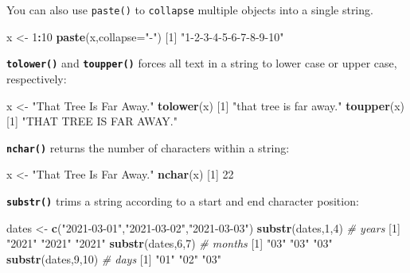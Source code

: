 \documentclass[
]{book}
\newenvironment{Shaded}{\begin{snugshade}}{\end{snugshade}}
\newcommand{\CommentTok}[1]{\textcolor[rgb]{0.56,0.35,0.01}{\textit{#1}}}
\newcommand{\DataTypeTok}[1]{\textcolor[rgb]{0.13,0.29,0.53}{#1}}
\newcommand{\DecValTok}[1]{\textcolor[rgb]{0.00,0.00,0.81}{#1}}
\newcommand{\KeywordTok}[1]{\textcolor[rgb]{0.13,0.29,0.53}{\textbf{#1}}}
\newcommand{\NormalTok}[1]{#1}
\newcommand{\OperatorTok}[1]{\textcolor[rgb]{0.81,0.36,0.00}{\textbf{#1}}}
\newcommand{\StringTok}[1]{\textcolor[rgb]{0.31,0.60,0.02}{#1}}
\begin{document}
You can also use \texttt{paste()} to \texttt{collapse} multiple objects into a single string.

\begin{Shaded}
\begin{Highlighting}[]
\NormalTok{x <-}\StringTok{ }\DecValTok{1}\OperatorTok{:}\DecValTok{10}
\KeywordTok{paste}\NormalTok{(x,}\DataTypeTok{collapse=}\StringTok{"-"}\NormalTok{)}
\NormalTok{[}\DecValTok{1}\NormalTok{] }\StringTok{"1-2-3-4-5-6-7-8-9-10"}
\end{Highlighting}
\end{Shaded}

\textbf{\texttt{tolower()}} and \textbf{\texttt{toupper()}} forces all text in a string to lower case or upper case, respectively:

\begin{Shaded}
\begin{Highlighting}[]
\NormalTok{x <-}\StringTok{ "That Tree Is Far Away."}
\KeywordTok{tolower}\NormalTok{(x)}
\NormalTok{[}\DecValTok{1}\NormalTok{] }\StringTok{"that tree is far away."}
\KeywordTok{toupper}\NormalTok{(x)}
\NormalTok{[}\DecValTok{1}\NormalTok{] }\StringTok{"THAT TREE IS FAR AWAY."}
\end{Highlighting}
\end{Shaded}

\textbf{\texttt{nchar()}} returns the number of characters within a string:

\begin{Shaded}
\begin{Highlighting}[]
\NormalTok{x <-}\StringTok{ "That Tree Is Far Away."}
\KeywordTok{nchar}\NormalTok{(x)}
\NormalTok{[}\DecValTok{1}\NormalTok{] }\DecValTok{22}
\end{Highlighting}
\end{Shaded}

\textbf{\texttt{substr()}} trims a string according to a start and end character position:

\begin{Shaded}
\begin{Highlighting}[]
\NormalTok{dates <-}\StringTok{ }\KeywordTok{c}\NormalTok{(}\StringTok{"2021-03-01"}\NormalTok{,}\StringTok{"2021-03-02"}\NormalTok{,}\StringTok{"2021-03-03"}\NormalTok{)}
\KeywordTok{substr}\NormalTok{(dates,}\DecValTok{1}\NormalTok{,}\DecValTok{4}\NormalTok{) }\CommentTok{# years}
\NormalTok{[}\DecValTok{1}\NormalTok{] }\StringTok{"2021"} \StringTok{"2021"} \StringTok{"2021"}
\KeywordTok{substr}\NormalTok{(dates,}\DecValTok{6}\NormalTok{,}\DecValTok{7}\NormalTok{) }\CommentTok{# months}
\NormalTok{[}\DecValTok{1}\NormalTok{] }\StringTok{"03"} \StringTok{"03"} \StringTok{"03"}
\KeywordTok{substr}\NormalTok{(dates,}\DecValTok{9}\NormalTok{,}\DecValTok{10}\NormalTok{) }\CommentTok{# days}
\NormalTok{[}\DecValTok{1}\NormalTok{] }\StringTok{"01"} \StringTok{"02"} \StringTok{"03"}
\end{Highlighting}
\end{Shaded}
\end{document}
